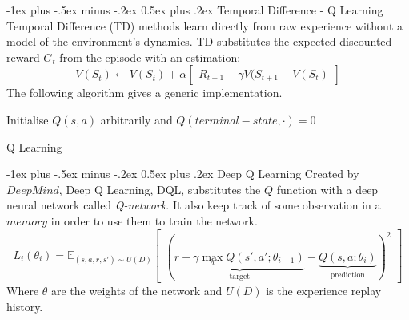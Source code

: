 \documentclass[10pt,landscape]{article}
\makeatletter
\renewcommand{\section}{\@startsection{section}{1}{0mm}%
                                {-1ex plus -.5ex minus -.2ex}%
                                {0.5ex plus .2ex}%
                                {\normalfont\large\bfseries}}
\makeatother
\begin{document}
\begin{multicols}{3}
\section{Temporal Difference - Q Learning}
Temporal Difference (TD) methods learn directly from raw experience without a model of the environment's dynamics. TD substitutes the expected discounted reward $G_t$ from the episode with an estimation:
\begin{equation}
V(S_t) \leftarrow V(S_t) + \alpha \begin{bmatrix}
 R_{t + 1} + \gamma V(S_{t+1} - V(S_t)
\end{bmatrix}
\end{equation}
The following algorithm gives a generic implementation.
\begin{algorithm}[H]
 Initialise $Q(s,a)$ arbitrarily and $Q(terminal-state, ·) = 0$\\
\caption{Q Learning}
\end{algorithm}


\section{Deep Q Learning}
Created by $DeepMind$, Deep Q Learning, DQL, substitutes the $Q$ function with a deep neural network called \emph{Q-network}. It also keep track of some observation in a $memory$ in order to use them to train the network.
\begin{equation}
L_i(\theta_i) = \mathbb{E}_{(s, a, r, s') \sim U(D)}\begin{bmatrix}
        ( \underbrace{r + \gamma \max\limits_a Q(s',a'; \theta_{i-1})}_\text{target} - \underbrace{Q(s,a;\theta_i)}_\text{prediction})^2
\end{bmatrix}
\end{equation}
Where $\theta$ are the weights of the network and $U(D)$ is the experience replay history.


\end{multicols}
\end{document}

